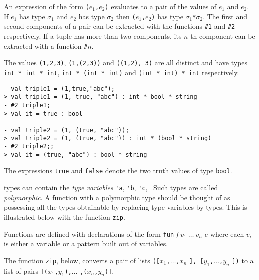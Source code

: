An expression of the form
{\small\verb|(|}$e_1${\small\verb|,|}$e_2${\small\verb|)|} evaluates
to a pair of the values of $e_1$ and $e_2$. If $e_1$ has type
$\sigma_1$ and $e_2$ has type $\sigma_2$ then
{\small\verb|(|}$e_1${\small\verb|,|}$e_2${\small\verb|)|} has type
$\sigma_1${\small\verb|*|}$\sigma_2$.  The first and second components
of a pair can be extracted with the \ML{} functions {\small\verb|#1|}
and {\small\verb|#2|} respectively.  If a tuple has more than two
components, its $n$-th component can be extracted with a function
{\small\verb|#|$n$}.

The values {\small\verb|(1,2,3)|}, {\small\verb|(1,(2,3))|} and
{\small\verb|((1,2), 3)|} are all distinct and have types
\linebreak{} {\small\verb|int * int * int|}, {\small\verb|int * (int * int)|} and
{\small\verb|(int * int) * int|} respectively.

\begin{session}
\begin{verbatim}
- val triple1 = (1,true,"abc");
> val triple1 = (1, true, "abc") : int * bool * string
- #2 triple1;
> val it = true : bool

- val triple2 = (1, (true, "abc"));
> val triple2 = (1, (true, "abc")) : int * (bool * string)
- #2 triple2;;
> val it = (true, "abc") : bool * string
\end{verbatim}
\end{session}

\noindent The \ML{} expressions {\small\verb|true|} and {\small\verb|false|}
denote the two truth values of type {\small\verb|bool|}.

\ML{} types can contain the {\it type variables\/} {\small\verb|'a|},
{\small\verb|'b|}, {\small\verb|'c|}, \etc\ Such types are called {\it
polymorphic\/}. A function with a polymorphic type should be thought of as
possessing all the types obtainable by replacing type variables by types.
This is illustrated below with the function {\small\verb|zip|}.

Functions are defined with declarations of the form {\small\verb|fun|}$\ f\
v_1\ \ldots\ v_n$ \ml{=} $e$ where each $v_i$ is either a variable or a pattern
built out of variables.

The function {\small\verb|zip|}, below, converts a pair of lists
{\small\verb|([|}$x_1${\small\verb|,|}$\ldots${\small\verb|,|}$x_n$%
{\small\verb|], [|}$y_1${\small\verb|,|}$\ldots${\small\verb|,|}$y_n$%
{\small\verb|])|} to a list of pairs
{\small\verb|[(|}$x_1${\small\verb|,|}$y_1${\small\verb|),|}$\ldots$%
{\small\verb|,(|}$x_n${\small\verb|,|}$y_n${\small\verb|)]|}.

